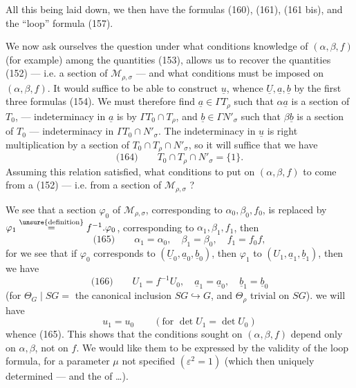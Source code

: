 
All this being laid down, we then have the formulas
(160), (161), (161 bis), and the ``loop'' formula (157).

We now ask ourselves the question
under what conditions knowledge of
$(\alpha,\beta,f)$ (for example) among the quantities (153),
allows us to recover the quantities (152) ---
i.e. a section of $\mathcal M_{\rho,\sigma}$ --- and what conditions
must be imposed on $(\alpha,\beta,f)$. It
would suffice  to be able to construct $\underline u$, whence
$\underline U,\underline a,\underline b$ by the first three formulas
(154).  We must
therefore find $\underline a\in\Gamma T_\rho$ such that $\alpha\underline a$ is a section
of $T_0$, --- indeterminacy in $\underline a$ is by
$\Gamma T_0\cap T_\rho$, and $\underline b\in\Gamma N'_\sigma$ such that $\beta\underline b$ is a section
of $T_0$ --- indeterminacy in  $\Gamma T_0\cap N'_\sigma$.
The indeterminacy in $\underline u$ is right
multiplication by a section of $T_0\cap T_\rho\cap N'_\sigma$, so it
will suffice that we have
\[
\text{(164)}\qquad T_0\cap T_\rho\cap N'_\sigma=\{1\}.
\]
Assuming this relation satisfied, what
conditions to put on $(\alpha,\beta,f)$ to come
from a  (152) --- i.e. from a section of $\mathcal M_{\rho,\sigma}$ ?



We see that  a section \deleted{$\unsure{\varphi}$} $\varphi_0$ of $\mathcal M_{\rho,\sigma}$, 
 corresponding to $\alpha_0,\beta_0,f_0$, is replaced
by $\varphi_1\overset{\unsure{\text{definition}}}{=}f^{-1}.\varphi_0$, corresponding to $\alpha_1,\beta_1,f_1$, then
\[
\text{(165)}\qquad \alpha_1=\alpha_0,\quad\beta_1=\beta_0,\quad f_1=f_0f,
\]
for we see that if $\varphi_0$ corresponds to $(\underline U_0,\underline a_0,\underline b_0)$,
then $\varphi_1$ to $(U_1,\underline a_1,\underline b_1)$, then we have
\[
\text{(166)}\qquad U_1=f^{-1}U_0,\quad\underline a_1=\underline a_0,\quad\underline b_1=\underline b_0
\]
(for $\Theta_G\mid SG=$ the canonical inclusion $SG\hookrightarrow G$,
and $\Theta_\rho$\inserted{$,\Theta_\sigma$}  trivial on $SG$).   we will have
\[
u_1=u_0\qquad (\text{for }\det U_1=\det U_0)
\]
whence (165). This shows that the conditions
sought on $(\alpha,\beta,f)$ depend only on
$\alpha,\beta$, not on $f$. We would like them
to be expressed by the validity of the loop
formula, for a parameter \inserted{$\varepsilon,$} $\mu$ not specified $(\varepsilon^2=1)$
(which  then uniquely determined --- and 
the  of \ldots).


